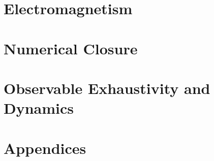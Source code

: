 \documentclass[12pt,openany]{book}
\numberwithin{equation}{section}
\theoremstyle{plain}
\theoremstyle{definition}
\theoremstyle{remark}
\begin{document}
\part{Electromagnetism}



\part{Numerical Closure}




\part{Observable Exhaustivity and Dynamics}


\appendix
\part{Appendices}





\backmatter
\newcommand{\doi}[1]{DOI: \href{https://doi.org/#1}{#1}.}
\newcommand{\arxivref}[1]{arXiv: \href{https://arxiv.org/abs/#1}{#1}.}
\end{document}
